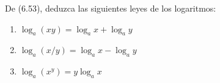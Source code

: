 \item De (6.53), deduzca las siguientes leyes de los logaritmos:
    \begin{enumerate}
        \item[(a)] $\log_a(xy) = \log_a x + \log_a y$
        \item[(b)] $\log_a(x/y) = \log_a x - \log_a y$
        \item[(c)] $\log_a(x^y) = y \log_a x$
    \end{enumerate}
